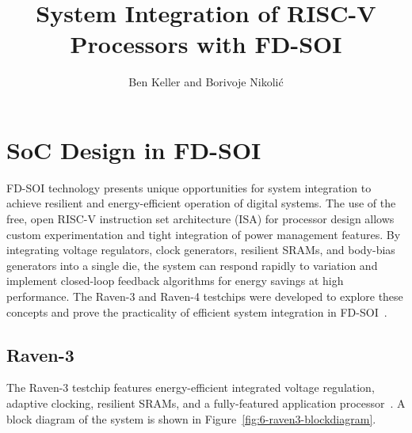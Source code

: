 \documentclass[graybox]{svmult}
\begin{document}
\title{System Integration of RISC-V Processors with FD-SOI}
\author{Ben Keller and Borivoje Nikoli\'{c}}
%
%
\maketitle



\section{SoC Design in FD-SOI}

FD-SOI technology presents unique opportunities for system integration to achieve resilient and energy-efficient operation of digital systems.
The use of the free, open RISC-V instruction set architecture (ISA) for processor design allows custom experimentation and tight integration of power management features.
By integrating voltage regulators, clock generators, resilient SRAMs, and body-bias generators into a single die, the system can respond rapidly to variation and implement closed-loop feedback algorithms for energy savings at high performance.
The Raven-3 and Raven-4 testchips were developed to explore these concepts and prove the practicality of efficient system integration in FD-SOI~\cite{Keller2017Dissertation}.

\subsection{Raven-3}

The Raven-3 testchip features energy-efficient integrated voltage regulation, adaptive clocking, resilient SRAMs, and a fully-featured application processor~\cite{Zimmer2016}.
A block diagram of the system is shown in Figure~\ref{fig:6-raven3-blockdiagram}.
\end{document}
